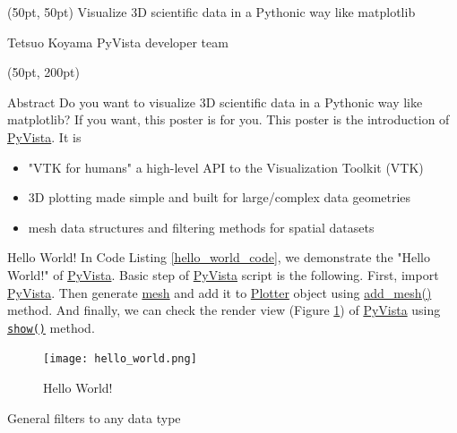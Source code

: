 \documentclass[final]{beamer}
\begin{document}
\begin{frame}[fragile]
\begin{textblock*}{3450pt}(50pt, 50pt)
\Huge Visualize 3D scientific data in a Pythonic way like matplotlib

\Large Tetsuo Koyama
\small PyVista developer team
\end{textblock*}

\begin{textblock*}{800pt}(50pt, 200pt)
\begin{block}{Abstract}
Do you want to visualize 3D scientific data in a Pythonic way like matplotlib?
If you want, this poster is for you.
This poster is the introduction of \href{https://pypi.org/project/pyvista/}{PyVista}.
It is
\begin{itemize}
\item "VTK for humans"\: a high-level API to the Visualization Toolkit (VTK)
\item 3D plotting made simple and built for large/complex data geometries
\item mesh data structures and filtering methods for spatial datasets
\end{itemize}

\end{block}
\begin{block}{Hello World!}
In Code Listing \ref{hello_world_code}, we demonstrate the "Hello World!" of \href{https://pypi.org/project/pyvista/}{PyVista}.
Basic step of \href{https://pypi.org/project/pyvista/}{PyVista} script is the following.
First, import \href{https://pypi.org/project/pyvista/}{PyVista}.
Then generate \href{https://dev.pyvista.org/getting-started/what-is-a-mesh.html}{mesh} and add it to
\href{https://dev.pyvista.org/plotting/plotting.html#pyvista.Plotter}{Plotter} object using \href{https://dev.pyvista.org/plotting/plotting.html#pyvista.BasePlotter.add\_mesh}{add\_mesh()} method.
And finally, we can check the render view (Figure \ref{HelloWorldFigure}) of \href{https://pypi.org/project/pyvista/}{PyVista} using \href{https://dev.pyvista.org/plotting/plotting.html#pyvista.Plotter.show}{\texttt{show()}} method.


\begin{figure}
\texttt{[image: hello\_world.png]}
\caption{Hello World!\label{HelloWorldFigure}}
\end{figure}
\end{block}
\begin{block}{General filters to any data type}


\end{block}
\end{textblock*}
\end{frame}
\end{document}
